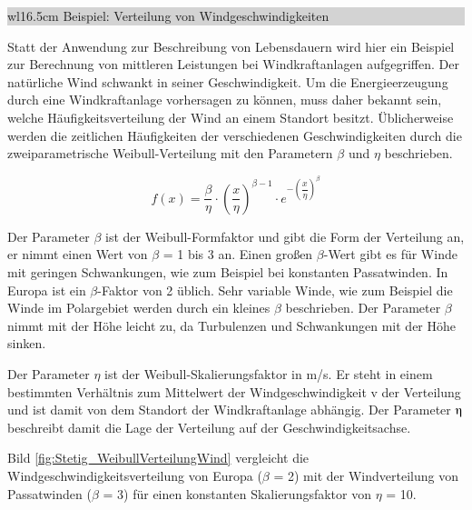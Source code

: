 \noindent
\colorbox{lightgray}{%
%
\renewcommand\arraystretch{0.6}%
\begin{tabular}{ wl{16.5cm} }
{\selectfont
\noindent
Beispiel: Verteilung von Windgeschwindigkeiten}
\end{tabular}%
}\bigskip

\noindent Statt der Anwendung zur Beschreibung von Lebensdauern wird hier ein Beispiel zur Berechnung von mittleren Leistungen bei Windkraftanlagen aufgegriffen. Der nat\"{u}rliche Wind schwankt in seiner Geschwindigkeit. Um die Energieerzeugung durch eine Windkraftanlage vorhersagen zu k\"{o}nnen, muss daher bekannt sein, welche H\"{a}ufigkeitsverteilung der Wind an einem Standort besitzt. \"{U}blicherweise werden die zeitlichen H\"{a}ufigkeiten der verschiedenen Geschwindigkeiten durch die zweiparametrische Weibull-Verteilung mit den Parametern $\beta$ und $\eta$ beschrieben. 

\begin{equation}\label{eq:fourhundredsninetyone}
f(x)=\dfrac{\beta }{\eta} \cdot \left(\dfrac{x}{\eta } \right)^{\beta -1} \cdot e^{-\left(\dfrac{x}{\eta} \right)^{\beta}}
\end{equation}

\noindent Der Parameter $\beta$ ist der Weibull-Formfaktor und gibt die Form der Verteilung an, er nimmt einen Wert von $\beta$ = 1 bis 3 an. Einen gro{\ss}en $\beta$-Wert gibt es f\"{u}r Winde mit geringen Schwankungen, wie zum Beispiel bei konstanten Passatwinden. In Europa ist ein $\beta$-Faktor von 2 \"{u}blich. Sehr variable Winde, wie zum Beispiel die Winde im Polargebiet werden durch ein kleines $\beta$ beschrieben. Der Parameter $\beta$ nimmt mit der H\"{o}he leicht zu, da Turbulenzen und Schwankungen mit der H\"{o}he sinken. \newline

\noindent Der Parameter $\eta$ ist der Weibull-Skalierungsfaktor in m/s. Er steht in einem bestimmten Verh\"{a}ltnis zum Mittelwert der Windgeschwindigkeit v der Verteilung und ist damit von dem Standort der Windkraftanlage abh\"{a}ngig. Der Parameter $\etaup$ beschreibt damit die Lage der Verteilung auf der Geschwindigkeitsachse.\newline

\noindent Bild \ref{fig:Stetig_WeibullVerteilungWind} vergleicht die Windgeschwindigkeitsverteilung von Europa ($\beta$ = 2) mit der Windverteilung von Passatwinden ($\beta$ = 3) f\"{u}r einen konstanten Skalierungsfaktor von $\eta$ = 10.

